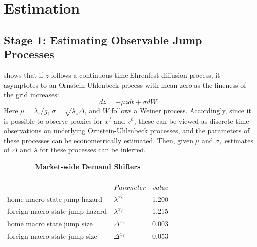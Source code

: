 \documentclass[12pt,titlepage]{article}
\begin{document}
\section{Estimation}

\subsection{Stage 1: Estimating Observable Jump Processes}

\citet{shimer2005cyclical} shows that if $z$ follows a continuous time Ehrenfest
diffusion process, it asymptotes to an Ornstein-Uhlenbeck process with mean
zero as the fineness of the grid increases:\footnotemark{} 
\begin{equation*}
dz=-\mu zdt+\sigma dW.
\end{equation*}%
Here $\mu =\lambda _{z}/g$, $\sigma =\sqrt{\lambda _{z}}\Delta $, and $W$
follows a Weiner process. Accordingly, since it is possible to observe
proxies for $x^{f}$ and $x^{h}$, these can be viewed as discrete time
observations on underlying Ornstein-Uhlenbeck processes, and the parameters
of these processes can be econometrically estimated. Then, given $\mu $ and $%
\sigma ,$ estimates of $\Delta $ and $\lambda $ for these processes can be
inferred.

\begin{table}
    \centering
    \begin{tabular}{lll}
        \multicolumn{3}{c}{\textbf{}} \\ 
        \hline\hline
        & \textit{Parameter} & \textit{value} \\ \hline
        home macro state jump hazard    & $\lambda ^{x_{h}}$ & \multicolumn{1}{c}{1.200}  \\
        foreign macro state jump hazard & $\lambda ^{x_{f}}$ & \multicolumn{1}{c}{ 1.215} \\
        home macro state jump size      & $\Delta ^{x_{h}}$  & \multicolumn{1}{c}{0.003}  \\
        foreign macro state jump size   & $\Delta ^{x_{f}}$  & \multicolumn{1}{c}{0.053}  \\ \hline
    \end{tabular}%
    \caption{\textbf{Market-wide Demand Shifters}}
    \label{tab:dem_shift}
\end{table}
\end{document}
